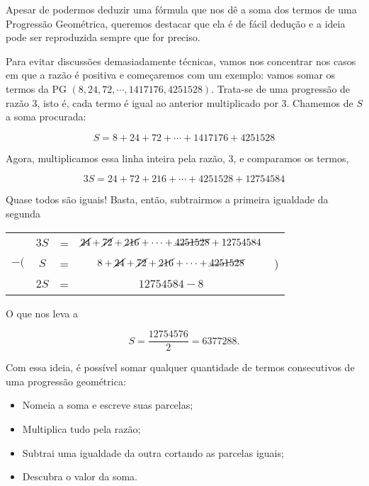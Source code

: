Apesar de podermos deduzir uma fórmula que nos dê a soma dos termos de uma Progressão Geométrica, queremos destacar que ela é de fácil dedução e a ideia pode ser reproduzida sempre que for preciso.

Para evitar discussões demasiadamente técnicas, vamos nos concentrar nos casos em que a razão é positiva e começaremos com um exemplo: vamos somar os termos da PG $(8, 24, 72,\cdots, 1417176, 4251528)$. Trata-se de uma progressão de razão $3$, isto é, cada termo é igual ao anterior multiplicado por $3$. Chamemos de $S$ a soma procurada: 

\[
S=8+24+72+ \cdots +1417176+4251528
\]

Agora, multiplicamos essa linha inteira pela razão, $3$, e comparamos os termos,

\[
3S=24+72+216+ \cdots +4251528+12754584
\]

Quase todos são iguais! Basta, então, subtrairmos a primeira igualdade da segunda

\begin{table}[H]
    \centering
    \begin{tabular}{ccccc}
       \  & $3S$ & = & $\cancel{24}+\cancel{72}+\cancel{216}+\cdots+\cancel{4251528} + 12754584$ & \ \\
       $-($ & $S$  & = & $8+\cancel{24}+\cancel{72}+\cancel{216}+\cdots+\cancel{4251528}$  & ) \\
       \midrule
       \  & $2S$ & = & $ 12754584 - 8$ & \ \\
    \end{tabular}
\end{table}

O que nos leva a

\[
S=\dfrac{12754576}{2}=6377288.
\]

Com essa ideia, é possível somar qualquer quantidade de termos consecutivos de uma progressão geométrica:

\begin{itemize}

\item Nomeia a soma e escreve suas parcelas;

\item Multiplica tudo pela razão;

\item Subtrai uma igualdade da outra cortando as parcelas iguais;

\item Descubra o valor da soma.

\end{itemize}

